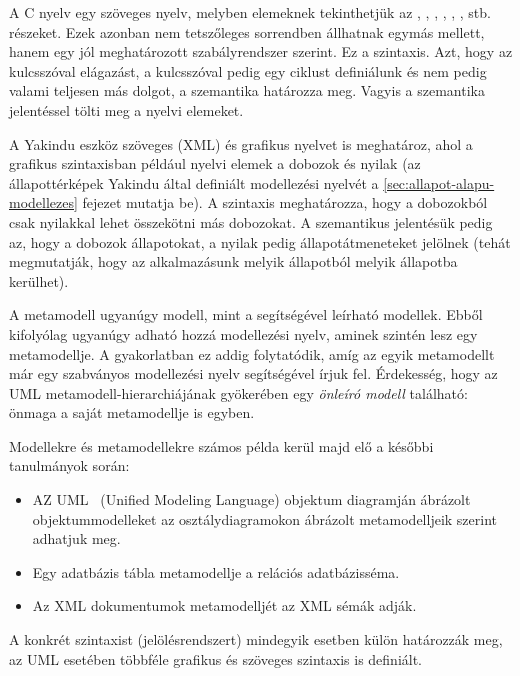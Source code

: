 \begin{pelda}
	A C nyelv egy szöveges nyelv, melyben elemeknek tekinthetjük az , , , , , , stb. részeket. Ezek azonban nem tetszőleges sorrendben állhatnak egymás mellett, hanem egy jól meghatározott szabályrendszer szerint. Ez a szintaxis. Azt, hogy az  kulcsszóval elágazást, a  kulcsszóval pedig egy ciklust definiálunk és nem pedig valami teljesen más dolgot, a szemantika határozza meg. Vagyis a szemantika jelentéssel tölti meg a nyelvi elemeket.
	
	A Yakindu eszköz szöveges (XML) és grafikus nyelvet is meghatároz, ahol a grafikus szintaxisban például nyelvi elemek a dobozok és nyilak (az állapottérképek Yakindu által definiált modellezési nyelvét a \ref{sec:allapot-alapu-modellezes} fejezet mutatja be). A szintaxis meghatározza, hogy a dobozokból csak nyilakkal lehet összekötni más dobozokat. A szemantikus jelentésük pedig az, hogy a dobozok állapotokat, a nyilak pedig állapotátmeneteket jelölnek (tehát megmutatják, hogy az alkalmazásunk melyik állapotból melyik állapotba kerülhet).
\end{pelda}

\begin{megjegyzes}
	A metamodell ugyanúgy modell, mint a segítségével leírható modellek. Ebből kifolyólag ugyanúgy adható hozzá modellezési nyelv, aminek szintén lesz egy metamodellje. A gyakorlatban ez addig folytatódik, amíg az egyik metamodellt már egy szabványos modellezési nyelv segítségével írjuk fel. Érdekesség, hogy az UML metamodell-hierarchiájának gyökerében egy \emph{önleíró modell} található: önmaga a saját metamodellje is egyben.
\end{megjegyzes}

\begin{pelda}
	Modellekre és metamodellekre számos példa kerül majd elő a későbbi tanulmányok során:
	\begin{itemize}
		\item AZ UML~\cite{UML} (Unified Modeling Language) objektum diagramján ábrázolt objektummodelleket az osztálydiagramokon ábrázolt metamodelljeik szerint adhatjuk meg.
		\item Egy adatbázis tábla metamodellje a relációs adatbázisséma.
		\item Az XML dokumentumok metamodelljét az XML sémák adják.
	\end{itemize}
	A konkrét szintaxist (jelölésrendszert) mindegyik esetben külön határozzák meg, az UML esetében többféle grafikus és szöveges szintaxis is definiált.
\end{pelda}

